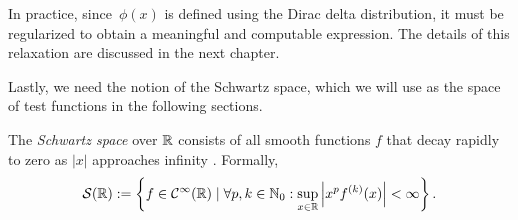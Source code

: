 In practice, since~$\phi(x)$ is defined using the Dirac delta distribution, it must be regularized to obtain a meaningful and computable expression. The details of this relaxation are discussed in the next chapter.

Lastly, we need the notion of the Schwartz space, which we will use as the space of test functions in the following sections.

\begin{definition} \label{def:Schwartz_space}
    The \emph{Schwartz space} over $\mathbb{R}$ consists of all smooth functions $f$ that decay rapidly to zero as $|x|$ approaches infinity \cite{richtmyer}.
    Formally,
    \[
    \mathcal{S}(\mathbb{R}) := \left\{f \in \mathcal{C}^{\infty}(\mathbb{R}) \mid \forall p, k \in \mathbb{N}_0: \sup_{x \in \mathbb{R}} \left| x^p f^{(k)}(x) \right| < \infty \right\}.
    \]
\end{definition}